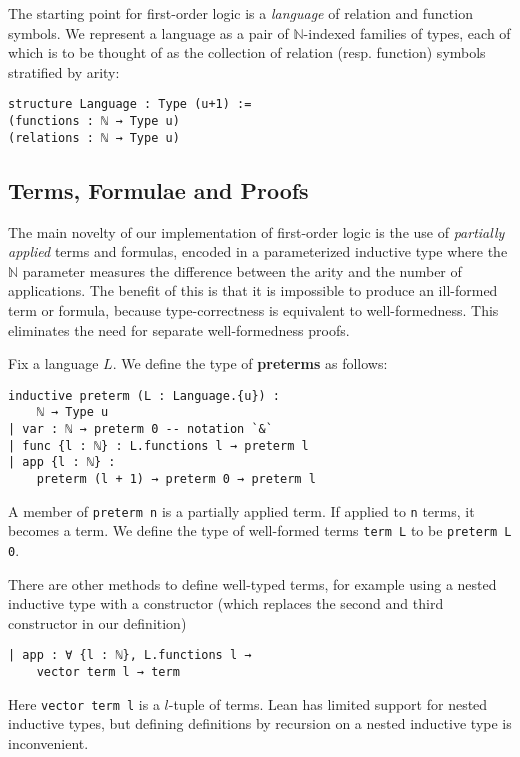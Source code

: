 \documentclass[sigplan,10pt,review, anonymous]{acmart}
\newcommand{\lil}{\lstinline}
\newcommand{\N}{\mathbb{N}}
\theoremstyle{definition}
\begin{document}
The starting point for first-order logic is a \emph{language} of relation and function symbols.
We represent a language as a pair of $\N$-indexed families of types, each of which is to be thought of as the collection of relation (resp. function) symbols stratified by arity:
\begin{lstlisting}
structure Language : Type (u+1) :=
(functions : ℕ → Type u)
(relations : ℕ → Type u)
\end{lstlisting}

\subsection{Terms, Formulae and Proofs}
\label{subsection:fol:terms}
The main novelty of our implementation of first-order logic is the use of \emph{partially applied} terms and formulas, encoded in a parameterized inductive type where the $\N$ parameter measures the difference between the arity and the number of applications.
The benefit of this is that it is impossible to produce an ill-formed term or formula, because type-correctness is equivalent to well-formedness.
This eliminates the need for separate well-formedness proofs.

Fix a language $L$. We define the type of \textbf{preterms} as follows:
\begin{lstlisting}
inductive preterm (L : Language.{u}) :
    ℕ → Type u
| var : ℕ → preterm 0 -- notation `&`
| func {l : ℕ} : L.functions l → preterm l
| app {l : ℕ} :
    preterm (l + 1) → preterm 0 → preterm l
\end{lstlisting}
A member of \lil{preterm n} is a partially applied term.
If applied to \lil{n} terms, it becomes a term.
We define the type of well-formed terms \lil{term L} to be \lil{preterm L 0}.

There are other methods to define well-typed terms, for example using a nested inductive type with a constructor (which replaces the second and third constructor in our definition)
\begin{lstlisting}
| app : ∀ {l : ℕ}, L.functions l →
    vector term l → term
\end{lstlisting}
Here \lil{vector term l} is a $l$-tuple of terms.
Lean has limited support for nested inductive types, but defining definitions by recursion on a nested inductive type is inconvenient.
\end{document}
